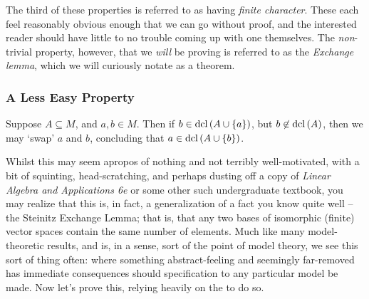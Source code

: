 The third of these properties is referred to as having \emph{finite character}. These each feel reasonably obvious enough that we can go without proof, and the interested reader should have little to no trouble coming up with one themselves. The \emph{non}-trivial property, however, that we \emph{will} be proving is referred to as the \emph{Exchange lemma}, which we will curiously notate as a theorem.

\subsubsection{A Less Easy Property}

\begin{theorem}
  \label{thm:exchange}
  Suppose $A \subseteq M$, and $a, b \in M$. Then if $b \in \operatorname{dcl}\left(A \cup \{ a \}\right)$, but $b \not\in \operatorname{dcl}\left(A\right)$, then we may `swap' $a$ and $b$, concluding that $a \in \operatorname{dcl}\left(A \cup \{ b \}\right)$.
\end{theorem}

Whilst this may seem apropos of nothing and not terribly well-motivated, with a bit of squinting, head-scratching, and perhaps dusting off a copy of \emph{Linear Algebra and Applications 6e} or some other such undergraduate textbook, you may realize that this is, in fact, a generalization of a fact you know quite well -- the Steinitz Exchange Lemma; that is, that any two bases of isomorphic (finite) vector spaces contain the same number of elements. Much like many model-theoretic results, and is, in a sense, sort of the point of model theory, we see this sort of thing often: where something abstract-feeling and seemingly far-removed has immediate consequences should specification to any particular model be made. Now let's prove this, relying heavily on the \Mt to do so.

